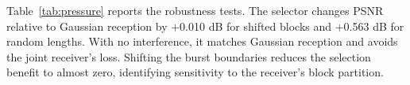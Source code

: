 Table~\ref{tab:pressure} reports the robustness tests. The selector changes PSNR relative to Gaussian reception by +0.010 dB for shifted blocks and +0.563 dB for random lengths. With no interference, it matches Gaussian reception and avoids the joint receiver's loss. Shifting the burst boundaries reduces the selection benefit to almost zero, identifying sensitivity to the receiver's block partition.
